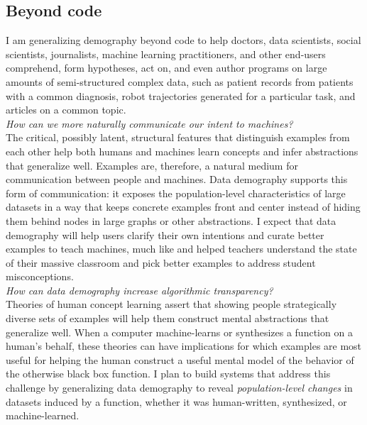 \documentclass[justified]{tufte-handout}
\begin{document}
\subsection*{Beyond code}
I am generalizing demography beyond code to help doctors, data scientists, social scientists, journalists, machine learning practitioners, and other end-users comprehend, form hypotheses, act on, and even author programs on large amounts of semi-structured complex data, such as patient records from patients with a common diagnosis, robot trajectories generated for a particular task, and articles on a common topic.\\[0.2cm]
\noindent
\emph{How can we more naturally communicate our intent to machines?}\\
\noindent
The critical, possibly latent, structural features that distinguish examples from each other help both humans and machines learn concepts and infer abstractions that generalize well. Examples are, therefore, a natural medium for communication between people and machines.
Data demography supports this form of communication: it exposes the population-level characteristics of large datasets in a way that keeps concrete examples front and center instead of hiding them behind nodes in large graphs or other abstractions. I expect that data demography will help users clarify their own intentions\cite{vule} and curate better examples to teach machines, much like \cite{overcode} and \cite{foobaz} helped teachers understand the state of their massive classroom and pick better examples to address student misconceptions.\\[0.2cm]
\noindent
\emph{How can data demography increase algorithmic transparency?}\\
\noindent
Theories of human concept learning assert that showing people strategically diverse sets of examples will help them construct mental abstractions that generalize well.\cite{vt} When a computer machine-learns or synthesizes a function on a human's behalf, these theories can have implications for which examples are most useful for helping the human construct a useful mental model of the behavior of the otherwise black box function. I plan to build systems that address this challenge by generalizing data demography to reveal \emph{population-level changes} in datasets induced by a function, whether it was human-written, synthesized, or machine-learned.\\[0.2cm] %
\end{document}
